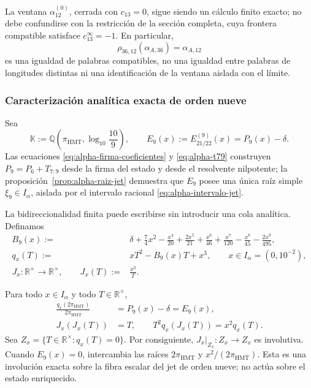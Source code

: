 La ventana \(\alpha_{12}^{(0)}\), cerrada con \(c_{13}=0\), sigue siendo un
cálculo finito exacto; no debe confundirse con la restricción de la sección
completa, cuya frontera compatible satisface \(c_{13}^{\infty}=-1\). En
particular,
\begin{equation}
 \rho_{36,12}(\alpha_{A,36})=\alpha_{A,12}
 \label{eq:alpha-rho-36-12-proyectiva}
\end{equation}
es una igualdad de palabras compatibles, no una igualdad entre palabras de
longitudes distintas ni una identificación de la ventana aislada con el
límite.

\subsubsection{Caracterización analítica exacta de orden nueve}

Sea
\[
 \mathbb K:=\mathbb Q\!\left(\pi_{\mathrm{HMT}},
                  \log_{10}\frac{10}{9}\right),
 \qquad
 E_9(x):=E_{21/22}^{(9)}(x)=P_9(x)-\delta .
\]
Las ecuaciones \eqref{eq:alpha-firma-coeficientes} y
\eqref{eq:alpha-t79} construyen \(P_9=P_6+T_{7:9}\) desde la firma del
estado y desde el resolvente nilpotente; la
proposición~\ref{prop:alpha-raiz-jet} demuestra que \(E_9\) posee una única
raíz simple \(\xi_9\in I_\alpha\), aislada por el intervalo racional
\eqref{eq:alpha-intervalo-jet}.

La bidireccionalidad finita puede escribirse sin introducir una cola
analítica. Definamos
\begin{align}
 B_9(x):={}&\delta+\frac74x^2-\frac{x^4}{20}
 +\frac{2x^5}{21}+\frac{x^6}{46}+\frac{x^7}{120}
 -\frac{x^8}{45}-\frac{2x^9}{495},
 \label{eq:alpha-b9-finito}\\
 q_x(T):={}&xT^2-B_9(x)T+x^3,\qquad x\in I_\alpha=(0,10^{-2}),
 \label{eq:alpha-q-involucion-finita}\\
 J_x:{\mathbb R}^{\times}\longrightarrow{\mathbb R}^{\times},
 \qquad J_x(T):={}&\frac{x^2}{T}.
\end{align}

\begin{proposition}
\label{prop:alpha-involucion-finita-exacta}
Para todo \(x\in I_\alpha\) y todo \(T\in\mathbb R^\times\),
\begin{align}
 \frac{q_x(2\pi_{\mathrm{HMT}})}{2\pi_{\mathrm{HMT}}}
 &=P_9(x)-\delta=E_9(x),
 \label{eq:alpha-q-equivale-p9}\\
 J_x(J_x(T))&=T,
 \qquad
 T^2q_x(J_x(T))=x^2q_x(T).
 \label{eq:alpha-j-involucion-exacta}
\end{align}
Sea \(Z_x=\{T\in\mathbb R^\times:q_x(T)=0\}\). Por consiguiente,
\(J_x|_{Z_x}:Z_x\to Z_x\) es involutiva. Cuando \(E_9(x)=0\),
intercambia las raíces \(2\pi_{\mathrm{HMT}}\) y
\(x^2/(2\pi_{\mathrm{HMT}})\). Esta es una involución exacta sobre la fibra
escalar del jet de orden nueve; no actúa sobre el estado enriquecido.
\end{proposition}

